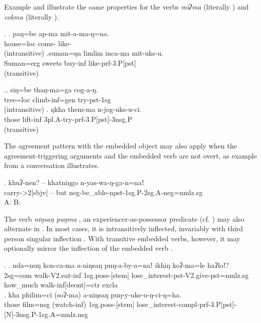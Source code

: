 Example \Next  and \NNext illustrate  the same properties for  the verbs \emph{miʔma}  (literally ) and  \emph{cokma}  (literally ). 

\ex. \ag.   paŋ=be     ap-ma            mit-a-ma-ŋ=na.\\  
	house{\sc =loc} come- like-\\
	 (intransitive) 
\bg.suman=ŋa    limlim inca-ma    mit-uks-u.\\
Suman{\sc =erg} sweets  buy{\sc -inf}  like{\sc [3sg.A]-prf-3.P[pst]}\\
	 (transitive) 

\ex.\ag.  siŋ=be    thaŋ-ma=ga       cog-a-ŋ.\\
tree{\sc =loc} climb{\sc -inf=gen} try{\sc -pst-1sg}\\
  (intransitive) 
\bg. ŋkha them-ma     n-jog-uks-u-ci.\\
those lift{\sc -inf} {\sc 3pl.A-}try{\sc -prf-3.P[pst]-3nsg.P}\\
  (transitive) 


The agreement pattern with the embedded object may also apply when the agreement-triggering arguments and the embedded verb are not overt, as example \Next from a conversation illustrates.

\exg. khuʔ-nen? – khatniŋgo n-yas-wa-ŋ-ga-n=naǃ\\
carry-{>2[sbjv]}  – but {\sc neg}-be\_able-{\sc npst-1sg.P-2sg.A-neg=nmlz.sg}\\
A:  B: 


The  verb \emph{niŋsaŋ puŋma} , an experiencer-as-pos\-ses\-sor predicate (cf. ) may also alternate in . In most cases, it is intransitively inflected, invariably with third person singular inflection \Next[a]. With transitive embedded verbs, however, it may optionally mirror the inflection of the embedded verb  \Next[b]. 

\ex. \ag. nda=nuŋ kon-ca-ma a-niŋsaŋ puŋ-a-by-a=naǃ ikhiŋ koʔ-ma=le haʔloǃ?\\
	{\sc 2sg=com} walk{\sc -V2.eat-inf} {\sc 1sg.poss-[stem]}  lose\_interest{\sc [3sg]-pst-V2.give-pst=nmlz.sg} how\_much walk{\sc -inf[deont]=ctr}  {\sc excla}\\
	\bg. kha philim=ci (soʔ-ma) a-niŋsaŋ puŋ-y-uks-u-ŋ-ci-ŋ=ha.\\
		{\sc those} film{\sc =nsg} (watch{\sc -inf}) {\sc 1sg.poss-[stem]} lose\_interest{\sc -compl-prf-3.P[pst]-[N]-3nsg.P-1sg.A=nmlz.nsg}\\
 


